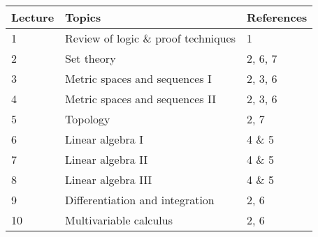 \documentclass[12pt]{article}
\begin{document}
\begin{longtable}{| p{1.5cm}  | p{8cm} | p{3cm} |}
\hline
{\bf{Lecture}}  & {\bf{Topics}} &  {\bf{References}} \\
\hline
1  & Review of logic \& proof techniques &  1 \\
\hline
2  & Set theory & 2, 6, 7 \\
\hline
3  &  Metric spaces and sequences I &  2, 3, 6\\
\hline
4  & Metric spaces and sequences II &  2, 3, 6\\
\hline
5  & Topology & 2, 7 \\
\hline
6 &  Linear algebra I & 4 \& 5 \\
\hline
7  &  Linear algebra II & 4 \& 5 \\
 \hline
8  & Linear algebra III &  4 \& 5 \\
 \hline
9  &  Differentiation and integration & 2,  6\\
\hline
10  &   Multivariable calculus & 2, 6 \\
\hline
\end{longtable}
\end{document}

